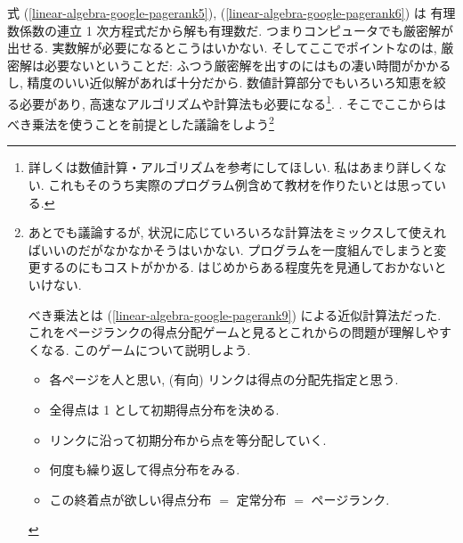 \documentclass[openany, a4paper, oneside]{jsbook}
\begin{document}
式 (\ref{linear-algebra-google-pagerank5}), (\ref{linear-algebra-google-pagerank6}) は
有理数係数の連立 1 次方程式だから解も有理数だ.
つまりコンピュータでも厳密解が出せる.
実数解が必要になるとこうはいかない.
そしてここでポイントなのは, 厳密解は必要ないということだ:
ふつう厳密解を出すのにはもの凄い時間がかかるし, 精度のいい近似解があれば十分だから.
数値計算部分でもいろいろ知恵を絞る必要があり, 高速なアルゴリズムや計算法も必要になる\footnote{詳しくは数値計算・アルゴリズムを参考にしてほしい.
私はあまり詳しくない.
これもそのうち実際のプログラム例含めて教材を作りたいとは思っている.}.
.
そこでここからはべき乗法を使うことを前提とした議論をしよう\footnote{あとでも議論するが,
状況に応じていろいろな計算法をミックスして使えればいいのだがなかなかそうはいかない.
プログラムを一度組んでしまうと変更するのにもコストがかかる.
はじめからある程度先を見通しておかないといけない.

べき乗法とは (\ref{linear-algebra-google-pagerank9}) による近似計算法だった.
これをページランクの得点分配ゲームと見るとこれからの問題が理解しやすくなる.
このゲームについて説明しよう.
\begin{itemize}
\item 各ページを人と思い, (有向) リンクは得点の分配先指定と思う.
\item 全得点は 1 として初期得点分布を決める.
\item リンクに沿って初期分布から点を等分配していく.
\item 何度も繰り返して得点分布をみる.
\item この終着点が欲しい得点分布 $=$ 定常分布 $=$ ページランク.
\end{itemize}

}
\end{document}
